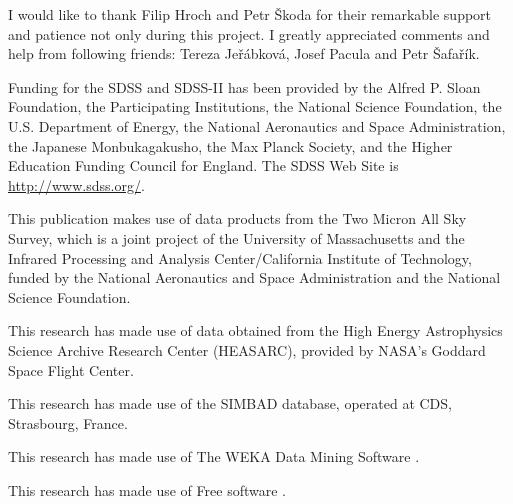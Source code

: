 

\begin{acknowledgements}      %


  I would like to thank Filip Hroch and Petr \v{S}koda for their
  remarkable support and patience not only during this project. I
  greatly appreciated comments and help from following friends: Tereza
  Je\v{r}\'{a}bkov\'{a}, Josef Pacula and Petr \v{S}afa\v{r}\'{i}k.

  \bigskip 
  Funding for the SDSS and SDSS-II has been provided by the
  Alfred P. Sloan Foundation, the Participating Institutions, the
  National Science Foundation, the U.S. Department of Energy, the
  National Aeronautics and Space Administration, the Japanese
  Monbukagakusho, the Max Planck Society, and the Higher Education
  Funding Council for England. The SDSS Web Site is
  \url{http://www.sdss.org/}.

  \bigskip

  This publication makes use of data products from the Two Micron All
  Sky Survey, which is a joint project of the University of
  Massachusetts and the Infrared Processing and Analysis
  Center/California Institute of Technology, funded by the National
  Aeronautics and Space Administration and the National Science
  Foundation.

  \bigskip 
  
  This research has made use of data obtained from the High
  Energy Astrophysics Science Archive Research Center (HEASARC),
  provided by NASA's Goddard Space Flight Center.

  \bigskip

  This research has made use of the SIMBAD database, operated at CDS,
  Strasbourg, France.

  \bigskip

  This research has made use of The WEKA Data Mining Software
  \citep{hall2009weka}.

  \bigskip

  This research has made use of Free software \citep{GPL}.




\end{acknowledgements}


